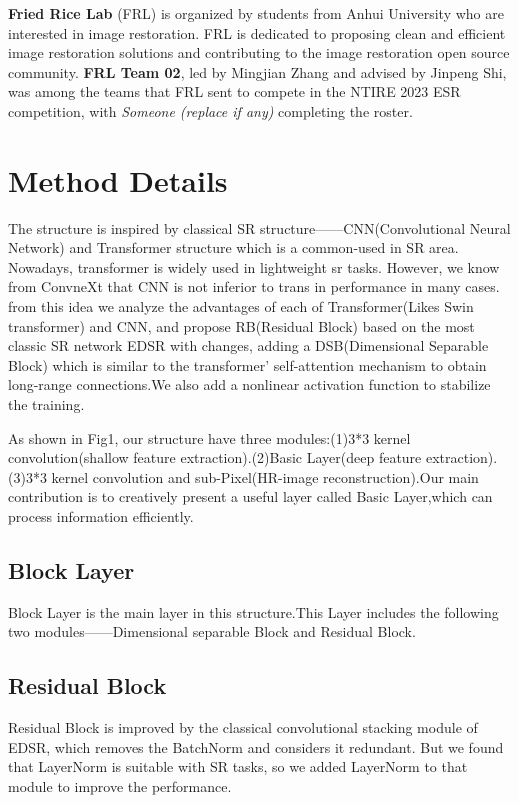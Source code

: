 \documentclass[10pt,twocolumn,letterpaper]{article}
\begin{document}
\textbf{Fried Rice Lab} (FRL) is organized by students from Anhui University who are interested in image restoration. FRL is dedicated to proposing clean and efficient image restoration solutions and contributing to the image restoration open source community. \textbf{FRL Team 02}, led by Mingjian Zhang and advised by Jinpeng Shi, was among the teams that FRL sent to compete in the NTIRE 2023 ESR competition, with \textit{Someone (replace if any)} completing the roster.

\section{Method Details}

The structure is inspired by classical SR structure——CNN(Convolutional Neural Network) and Transformer structure which is a common-used in SR area.
Nowadays, transformer is widely used in lightweight sr tasks. However, we know from ConvneXt\cite{ref1} that CNN is not inferior to trans in performance in many cases. from this idea we analyze the advantages of each of Transformer(Likes Swin transformer\cite{ref2}) and CNN, and propose RB(Residual Block) based on the most classic SR network EDSR\cite{ref3} with changes, adding a DSB(Dimensional Separable Block) which is similar to the transformer' self-attention mechanism to obtain long-range connections.We also add a nonlinear activation function to stabilize the training.

As shown in Fig1, our structure have three modules:(1)3*3 kernel convolution(shallow feature extraction).(2)Basic Layer(deep feature extraction).(3)3*3 kernel convolution and sub-Pixel(HR-image reconstruction).Our main contribution is to creatively present a useful layer called Basic Layer,which can process information efficiently.

\subsection{Block Layer}
Block Layer is the main layer in this structure.This Layer includes the following two modules——Dimensional separable Block and Residual Block.

\subsection{Residual Block}
Residual Block is improved by the classical convolutional stacking module of EDSR, which removes the BatchNorm and considers it redundant. But we found that LayerNorm\cite{ref4} is suitable with SR tasks, so we added LayerNorm to that module to improve the performance.
\end{document}
